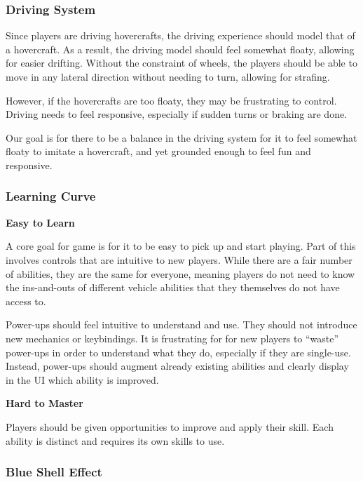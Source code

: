 \documentclass{article}
\theoremstyle{definition}
\begin{document}

\subsubsection{Driving System}

Since players are driving hovercrafts, the driving experience should model
that of a hovercraft. As a result, the driving model should feel somewhat
floaty, allowing for easier drifting. Without the constraint of wheels, the
players should be able to move in any lateral direction without needing to
turn, allowing for strafing.

However, if the hovercrafts are too floaty, they may be frustrating to control.
Driving needs to feel responsive, especially if sudden turns or braking are
done.

Our goal is for there to be a balance in the driving system for it to feel
somewhat floaty to imitate a hovercraft, and yet grounded enough to feel fun
and responsive.

\subsubsection{Learning Curve}

\textbf{Easy to Learn}

A core goal for game is for it to be easy to pick up and start playing.
Part of this involves controls that are intuitive to new players. While there
are a fair number of abilities, they are the same for everyone, meaning players
do not need to know the ins-and-outs of different vehicle abilities that they
themselves do not have access to.

Power-ups should feel intuitive to understand and use. They should not
introduce new mechanics or keybindings. It is frustrating for for new players
to ``waste'' power-ups in order to understand what they do, especially if they
are single-use. Instead, power-ups should augment already existing abilities
and clearly display in the UI which ability is improved.

\textbf{Hard to Master}

Players should be given opportunities to improve and apply their skill. Each
ability is distinct and requires its own skills to use.

\subsubsection{Blue Shell Effect} %
\end{document}
